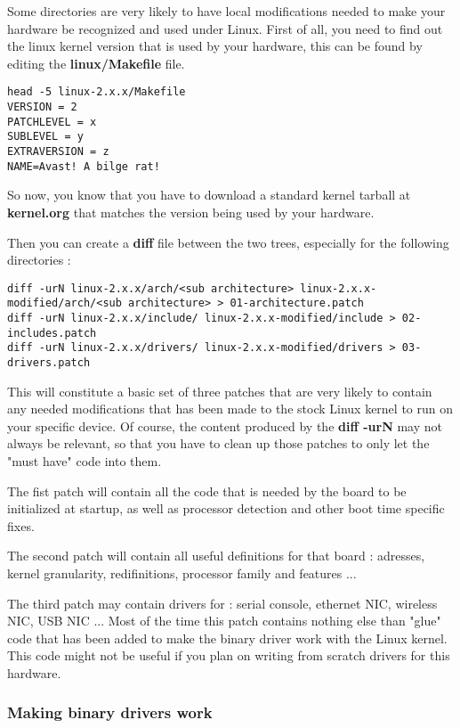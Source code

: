 Some directories are very likely to have local modifications needed to make your hardware be recognized and used under Linux. First of all, you need to find out the linux kernel version that is used by your hardware, this can be found by editing the \textbf{linux/Makefile} file.

\begin{verbatim}
head -5 linux-2.x.x/Makefile
VERSION = 2
PATCHLEVEL = x
SUBLEVEL = y
EXTRAVERSION = z
NAME=Avast! A bilge rat!
\end{verbatim}

So now, you know that you have to download a standard kernel tarball at \textbf{kernel.org} that matches the version being used by your hardware.

Then you can create a \textbf{diff} file between the two trees, especially for the following directories :

\begin{verbatim}
diff -urN linux-2.x.x/arch/<sub architecture> linux-2.x.x-modified/arch/<sub architecture> > 01-architecture.patch
diff -urN linux-2.x.x/include/ linux-2.x.x-modified/include > 02-includes.patch
diff -urN linux-2.x.x/drivers/ linux-2.x.x-modified/drivers > 03-drivers.patch
\end{verbatim}

This will constitute a basic set of three patches that are very likely to contain any needed modifications that has been made to the stock Linux kernel to run on your specific device. Of course, the content produced by the \textbf{diff -urN} may not always be relevant, so that you have to clean up those patches to only let the "must have" code into them.

The fist patch will contain all the code that is needed by the board to be initialized at startup, as well as processor detection and other boot time specific fixes.

The second patch will contain all useful definitions for that board : adresses, kernel granularity, redifinitions, processor family and features ...

The third patch may contain drivers for : serial console, ethernet NIC, wireless NIC, USB NIC ... Most of the time this patch contains nothing else than "glue" code that has been added to make the binary driver work with the Linux kernel. This code might not be useful if you plan on writing from scratch drivers for this hardware.

\subsubsection{Making binary drivers work}

